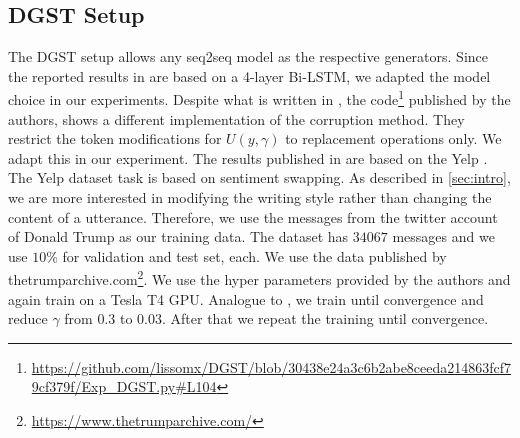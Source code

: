 \documentclass[twocolumn]{tum-article}
\begin{document}
\subsection{DGST Setup}\label{sec:dgst_setup}
The DGST setup allows any seq2seq model as the respective generators. Since the reported results in \cite{li2020dgst} are based on a 4-layer Bi-LSTM, we adapted the model choice in our experiments. Despite what is written in \cite{li2020dgst}, the code\footnote{\url{https://github.com/lissomx/DGST/blob/30438e24a3c6b2abe8ceeda214863fcf79cf379f/Exp\_DGST.py\#L104}} published by the authors, shows a different implementation of the corruption method. They restrict the token modifications for $U(y, \gamma)$ to replacement operations only. We adapt this in our experiment. The results published in \cite{li2020dgst} are based on the Yelp \cite{li2018delete}. The Yelp dataset task is based on sentiment swapping. As described in \autoref{sec:intro}, we are more interested in modifying the writing style rather than changing the content of a utterance. Therefore, we use the messages from the twitter account of Donald Trump as our training data. The dataset has $34067$ messages and we use $10\%$ for validation and test set, each. We use the data published by thetrumparchive.com\footnote{\url{https://www.thetrumparchive.com/}}. We use the hyper parameters provided by the authors and again train on a Tesla T4 GPU. Analogue to \cite{li2020dgst}, we train until convergence and reduce $\gamma$ from $0.3$ to $0.03$. After that we repeat the training until convergence.     
\end{document}
